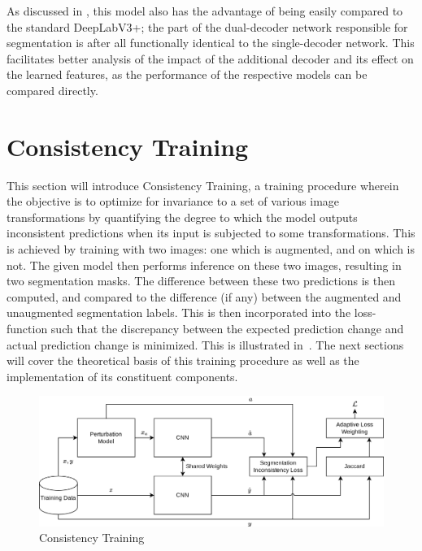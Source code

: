 As discussed in , this model also has the advantage of being easily compared to the standard DeepLabV3+; the part of the dual-decoder network responsible for segmentation is after all functionally identical to the single-decoder network. This facilitates better analysis of the impact of the additional decoder and its effect on the learned features, as the performance of the respective models can be compared directly. 

\section{Consistency Training}
This section will introduce Consistency Training, a training procedure wherein the objective is to optimize for invariance to a set of various image transformations by quantifying the degree to which the model outputs inconsistent predictions when its input is subjected to some transformations. This is achieved by training with two images: one which is augmented, and on which is not. The given model then performs inference on these two images, resulting in two segmentation masks. The difference between these two predictions is then computed, and compared to the difference (if any) between the augmented and unaugmented segmentation labels. This is then incorporated into the loss-function such that the discrepancy between the expected prediction change and actual prediction change is minimized. This is illustrated in~. The next sections will cover the theoretical basis of this training procedure as well as the implementation of its constituent components.  

\begin{figure}[htb]
    \centering
    \includegraphics[width=\linewidth]{illustrations/consistency_training.png}
    \caption{Consistency Training}
    \label{fig:consistency_training}
\end{figure}


